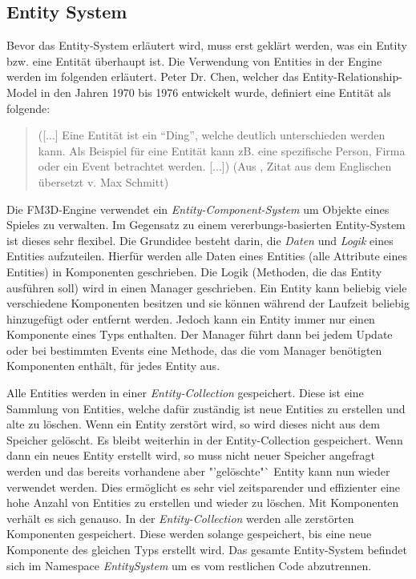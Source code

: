 \subsection{Entity System}
\label{entitysystem}
Bevor das Entity-System erläutert wird, muss erst geklärt werden, was ein Entity bzw. eine Entität überhaupt ist. Die Verwendung von Entities in der Engine werden im folgenden erläutert.
Peter Dr. Chen, welcher das Entity-Relationship-Model in den Jahren 1970 bis 1976 entwickelt wurde, definiert eine Entität als folgende:
\begin{quote}
	([...] Eine Entität ist ein "`Ding"', welche deutlich unterschieden werden kann. Als Beispiel für eine Entität kann zB. eine spezifische Person, Firma oder ein Event betrachtet werden. [...])
	(Aus \cite{entityrelationshipmodel}, Zitat aus dem Englischen übersetzt v. Max Schmitt)
\end{quote}

Die FM3D-Engine verwendet ein \textit{Entity-Component-System} um Objekte eines Spieles zu verwalten. Im Gegensatz zu einem vererbungs-basierten Entity-System ist dieses sehr flexibel. 
Die Grundidee besteht darin, die \textit{Daten} und \textit{Logik} eines Entities aufzuteilen. Hierfür werden alle Daten eines Entities (alle Attribute eines Entities) in Komponenten geschrieben. %
Die Logik (Methoden, die das Entity ausführen soll) wird in einen Manager geschrieben. 
Ein Entity kann beliebig viele verschiedene Komponenten besitzen und sie können während der Laufzeit beliebig hinzugefügt oder entfernt werden. Jedoch kann ein Entity immer nur einen Komponente eines Typs enthalten. 
Der Manager führt dann bei jedem Update oder bei bestimmten Events eine Methode, das die vom Manager benötigten Komponenten enthält, für jedes Entity aus.

Alle Entities werden in einer \textit{Entity-Collection} gespeichert. Diese ist eine Sammlung von Entities, welche dafür zuständig ist neue Entities zu erstellen und alte zu löschen. Wenn ein Entity zerstört wird, so wird dieses nicht aus dem Speicher gelöscht. Es bleibt weiterhin in der Entity-Collection gespeichert. 
Wenn dann ein neues Entity erstellt wird, so muss nicht neuer Speicher angefragt werden und das bereits vorhandene aber "'gelöschte"` Entity kann nun wieder verwendet werden. Dies ermöglicht es sehr viel zeitsparender und effizienter eine hohe Anzahl von Entities zu erstellen und wieder zu löschen. 
Mit Komponenten verhält es sich genauso. In der \textit{Entity-Collection} werden alle zerstörten Komponenten gespeichert. Diese werden solange gespeichert, bis eine neue Komponente des gleichen Typs erstellt wird. Das gesamte Entity-System befindet sich im Namespace \textit{EntitySystem} um es vom restlichen Code abzutrennen.

